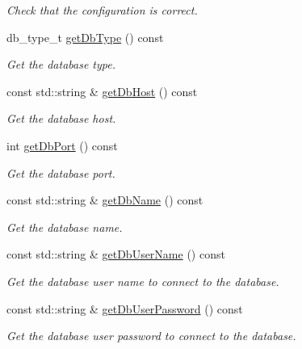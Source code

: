 \begin{DoxyCompactItemize}
\begin{DoxyCompactList}\small\item\em Check that the configuration is correct. \item\end{DoxyCompactList}\item 
db\_\-type\_\-t \hyperlink{classDbConfiguration_aa3f2342a112f6fbe49c55dcdf1c0ba06}{getDbType} () const 
\begin{DoxyCompactList}\small\item\em Get the database type. \item\end{DoxyCompactList}\item 
const std::string \& \hyperlink{classDbConfiguration_a1a086da9c68fc4f7486aeb6cdccf190c}{getDbHost} () const 
\begin{DoxyCompactList}\small\item\em Get the database host. \item\end{DoxyCompactList}\item 
int \hyperlink{classDbConfiguration_a990bf4ff748852ddf6c3855947222088}{getDbPort} () const 
\begin{DoxyCompactList}\small\item\em Get the database port. \item\end{DoxyCompactList}\item 
const std::string \& \hyperlink{classDbConfiguration_a3baca98b7587f48e9ce0fe3692ccfee3}{getDbName} () const 
\begin{DoxyCompactList}\small\item\em Get the database name. \item\end{DoxyCompactList}\item 
const std::string \& \hyperlink{classDbConfiguration_ad7574a825957ea574d97310d0e32f642}{getDbUserName} () const 
\begin{DoxyCompactList}\small\item\em Get the database user name to connect to the database. \item\end{DoxyCompactList}\item 
const std::string \& \hyperlink{classDbConfiguration_a24814f0a123ed8afdfc8f0883033bc80}{getDbUserPassword} () const 
\begin{DoxyCompactList}\small\item\em Get the database user password to connect to the database. \item\end{DoxyCompactList}\end{DoxyCompactItemize}
